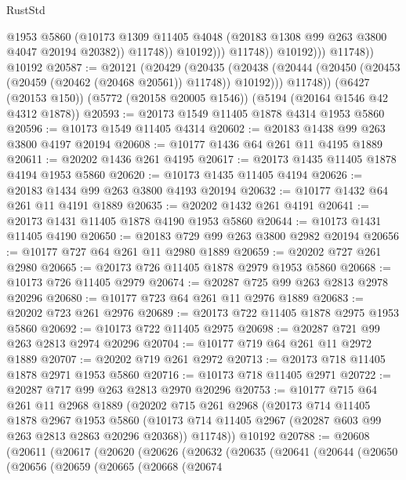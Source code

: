 \begin{lexlean}{RustStd}
\begin{coremodule}
{\begin{coremodule}
{{{{{{{{{{{{{{{{{{{{{{{{{{{{{                            @1953
                            @5860
                            (@10173
                              @1309
                              @11405
                              @4048
                              (@20183 @1308 @99 @263 @3800 @4047 @20194 @20382))
                            @11748))
                        @10192)))
                  @11748))
              @10192)))
        @11748))
    @10192
@20587 := @20121
    (@20429
      (@20435
        (@20438 (@20444 (@20450 (@20453 (@20459 (@20462 (@20468 @20561)) @11748)) @10192)))
        @11748))
    (@6427 (@20153 @150))
    (@5772 (@20158 @20005 @1546))
    (@5194 (@20164 @1546 @42 @4312 @1878))
@20593 := @20173 @1549 @11405 @1878 @4314 @1953 @5860
@20596 := @10173 @1549 @11405 @4314
@20602 := @20183 @1438 @99 @263 @3800 @4197 @20194
@20608 := @10177 @1436 @64 @261 @11 @4195 @1889
@20611 := @20202 @1436 @261 @4195
@20617 := @20173 @1435 @11405 @1878 @4194 @1953 @5860
@20620 := @10173 @1435 @11405 @4194
@20626 := @20183 @1434 @99 @263 @3800 @4193 @20194
@20632 := @10177 @1432 @64 @261 @11 @4191 @1889
@20635 := @20202 @1432 @261 @4191
@20641 := @20173 @1431 @11405 @1878 @4190 @1953 @5860
@20644 := @10173 @1431 @11405 @4190
@20650 := @20183 @729 @99 @263 @3800 @2982 @20194
@20656 := @10177 @727 @64 @261 @11 @2980 @1889
@20659 := @20202 @727 @261 @2980
@20665 := @20173 @726 @11405 @1878 @2979 @1953 @5860
@20668 := @10173 @726 @11405 @2979
@20674 := @20287 @725 @99 @263 @2813 @2978 @20296
@20680 := @10177 @723 @64 @261 @11 @2976 @1889
@20683 := @20202 @723 @261 @2976
@20689 := @20173 @722 @11405 @1878 @2975 @1953 @5860
@20692 := @10173 @722 @11405 @2975
@20698 := @20287 @721 @99 @263 @2813 @2974 @20296
@20704 := @10177 @719 @64 @261 @11 @2972 @1889
@20707 := @20202 @719 @261 @2972
@20713 := @20173 @718 @11405 @1878 @2971 @1953 @5860
@20716 := @10173 @718 @11405 @2971
@20722 := @20287 @717 @99 @263 @2813 @2970 @20296
@20753 := @10177
    @715
    @64
    @261
    @11
    @2968
    @1889
    (@20202
      @715
      @261
      @2968
      (@20173
        @714
        @11405
        @1878
        @2967
        @1953
        @5860
        (@10173 @714 @11405 @2967 (@20287 @603 @99 @263 @2813 @2863 @20296 @20368))
        @11748))
    @10192
@20788 := @20608
    (@20611
      (@20617
        (@20620
          (@20626
            (@20632
              (@20635
                (@20641
                  (@20644
                    (@20650
                      (@20656
                        (@20659
                          (@20665
                            (@20668
                              (@20674
}}}}}}}}}}}}}}}}}}}}}}}}}}}}}
\end{coremodule}}
\end{coremodule}
\end{lexlean}
